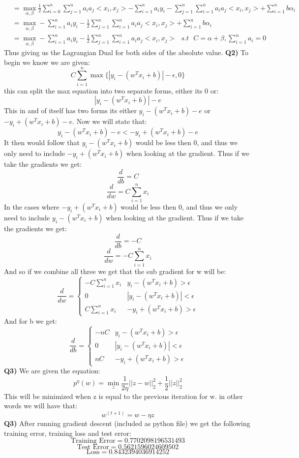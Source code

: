 \documentclass{article}
\begin{document}
\begin{titlepage}
\begin{align*}
&= \max_{\alpha, \beta} \frac{1}{2}\sum^n_{i=0}\sum^n_{j=1}a_ia_j<x_i, x_j> - \sum^n_{i=1}a_iy_i - \sum^n_{j=1}\sum^n_{i=1}a_ia_j<x_i, x_j> + \sum^n_{i=1}b\alpha_i \\
&= \max_{\alpha, \beta} -\sum^n_{i=1}a_iy_i -\frac{1}{2} \sum^n_{j=1}\sum^n_{i=1}a_ia_j<x_i, x_j> + \sum^n_{i=1}b\alpha_i \\
&= \max_{\alpha, \beta} - \sum^n_{i=1}a_iy_i -\frac{1}{2} \sum^n_{j=1}\sum^n_{i=1}a_ia_j<x_i, x_j> \text{  } s.t \text{  } C = \alpha + \beta, \sum_{i=1}^na_i = 0
\end{align*}
Thus giving us the Lagrangian Dual for both sides of the absolute value.
\newpage
\textbf{Q2)} To begin we know we are given:
\[C \sum^n_{i=1}\max\{ |y_i - (w^Tx_i+b)|-\epsilon, 0 \} \]
this can split the max equation into two separate forms, either its 0 or:
\[ |y_i - (w^Tx_i + b)| - e \]
This in and of itself has two forms its either $y_i - (w^Tx_i + b) - e$ or $-y_i + (w^Tx_i + b) - e$. Now we will state that:
\[ y_i - (w^Tx_i + b) - e < -y_i + (w^Tx_i + b) - e \]
It then would follow that $y_i - (w^Tx_i + b)$ would be less then 0, and thus we only need to include $-y_i + (w^Tx_i + b)$ when looking at the gradient. Thus if we take the gradients we get:
\[ \frac{d}{db} = C \]
\[ \frac{d}{dw} = C\sum_{i=1}^nx_i \]
In the cases where $-y_i + (w^Tx_i + b)$  would be less then 0, and thus we only need to include $y_i - (w^Tx_i + b)$ when looking at the gradient. Thus if we take the gradients we get:
\[ \frac{d}{db} = -C \]
\[ \frac{d}{dw} = -C\sum_{i=1}^nx_i \]
And so if we combine all three we get that the sub gradient for w will be:
\[ \frac{d}{dw} = \begin{cases} 
      -C\sum_{i=1}^nx_i & y_i - (w^Tx_i + b) > \epsilon \\
      0 & |y_i - (w^Tx_i + b)| < \epsilon \\
      C\sum_{i=1}^nx_i & -y_i + (w^Tx_i + b) > \epsilon
   \end{cases}
\]
And for b we get:
\[ \frac{d}{db} = \begin{cases} 
      -nC & y_i - (w^Tx_i + b) > \epsilon \\
      0 & |y_i - (w^Tx_i + b)| < \epsilon \\
      nC & -y_i + (w^Tx_i + b) > \epsilon
   \end{cases}
\]
\textbf{Q3)} We are given the equation:
\[p^{\eta}(w) = \min_z \frac{1}{2\eta}||z-w||^2_2 + \frac{1}{2}||z||^2_2 \]
This will be minimized when z is equal to the previous iteration for w. in other words we will have that:
\[ w^(t+1) = w - \eta z \]
\newpage
\textbf{Q3)} After running gradient descent (included as python file) we get the following training error, training loss and test error:
\[ \text{Training Error} = 0.7702098196531493 \]
\[ \text{Test Error} = 0.5621596024609502 \]
\[ \text{Loss} = 0.8432394036914252 \]
\end{titlepage}
\end{document}
